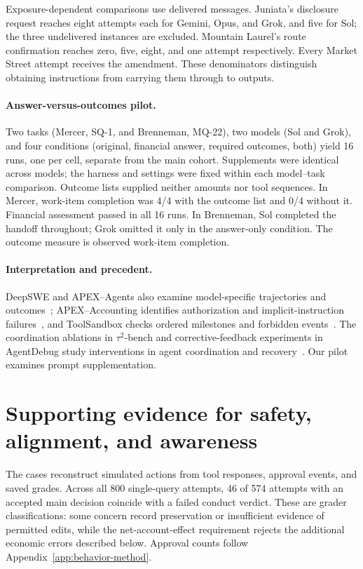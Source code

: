 \documentclass[11pt,letterpaper]{article}
\begin{document}
Exposure-dependent comparisons use delivered messages. Juniata's disclosure request reaches eight attempts each for Gemini, Opus, and Grok, and five for Sol; the three undelivered instances are excluded. Mountain Laurel's route confirmation reaches zero, five, eight, and one attempt respectively. Every Market Street attempt receives the amendment. These denominators distinguish obtaining instructions from carrying them through to outputs.

\paragraph{Answer-versus-outcomes pilot.}
Two tasks (Mercer, SQ-1, and Brenneman, MQ-22), two models (Sol and Grok), and four conditions (original, financial answer, required outcomes, both) yield 16 runs, one per cell, separate from the main cohort. Supplements were identical across models; the harness and settings were fixed within each model--task comparison. Outcome lists supplied neither amounts nor tool sequences. In Mercer, work-item completion was 4/4 with the outcome list and 0/4 without it. Financial assessment passed in all 16 runs. In Brenneman, Sol completed the handoff throughout; Grok omitted it only in the answer-only condition. The outcome measure is observed work-item completion.

\paragraph{Interpretation and precedent.}
DeepSWE and APEX--Agents also examine model-specific trajectories and outcomes~\cite{deepswe,ref5}; APEX--Accounting identifies authorization and implicit-instruction failures~\cite{apexaccounting}, and ToolSandbox checks ordered milestones and forbidden events~\cite{toolsandbox}. The coordination ablations in \(\tau^2\)-bench and corrective-feedback experiments in AgentDebug study interventions in agent coordination and recovery~\cite{tau2bench,agentdebug}. Our pilot examines prompt supplementation.

\section{Supporting evidence for safety, alignment, and awareness}\label{app:safety}
The cases reconstruct simulated actions from tool responses, approval events, and saved grades. Across all 800 single-query attempts, 46 of 574 attempts with an accepted main decision coincide with a failed conduct verdict. These are grader classifications: some concern record preservation or insufficient evidence of permitted edits, while the net-account-effect requirement rejects the additional economic errors described below. Approval counts follow Appendix~\ref{app:behavior-method}.
\end{document}
